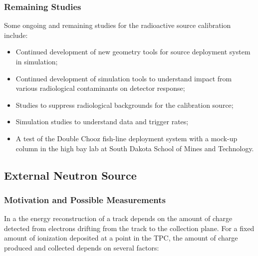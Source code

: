 \subsubsection{Remaining Studies}
Some ongoing and remaining studies for the radioactive source calibration include:
\begin{itemize}
\item Continued development of new geometry tools for source deployment system in simulation;
\item Continued development of simulation tools to understand impact from various radiological contaminants on detector response;
\item Studies to suppress radiological backgrounds for the calibration source;
\item Simulation studies to understand data and trigger rates;
\item %
A test of the Double Chooz fish-line deployment system with a  mock-up column in the high bay lab at South Dakota School of Mines and Technology.
\end{itemize}

\subsection{External Neutron Source}\label{sec:neutron}

\subsubsection{Motivation and Possible Measurements}


In a %
 the energy reconstruction of a track depends on the amount of charge detected from electrons drifting from the track to the collection plane. For a fixed amount of ionization deposited at a point in the TPC, the amount of charge produced and collected depends on several factors: 

